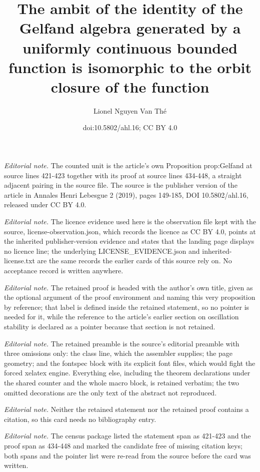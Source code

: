 \documentclass[10pt,a4paper]{article}
\title{The ambit of the identity of the Gelfand algebra generated by a uniformly continuous bounded function is isomorphic to the orbit closure of the function}
\author{Lionel Nguyen Van Thé}
\date{doi:10.5802/ahl.16; CC BY 4.0}
\theoremstyle{definition}
\numberwithin{equation}{section}
\numberwithin{figure}{section}
\numberwithin{table}{section}
\begin{document}
\maketitle
\noindent\textit{Editorial note.} The counted unit is the article's own Proposition prop:Gelfand at source lines 421-423 together with its proof at source lines 434-448, a straight adjacent pairing in the source file. The source is the publisher version of the article in Annales Henri Lebesgue 2 (2019), pages 149-185, DOI 10.5802/ahl.16, released under CC BY 4.0.\par\medskip
\noindent\textit{Editorial note.} The licence evidence used here is the observation file kept with the source, license-observation.json, which records the licence as CC BY 4.0, points at the inherited publisher-version evidence and states that the landing page displays no licence line; the underlying LICENSE\_EVIDENCE.json and inherited-license.txt are the same records the earlier cards of this source rely on. No acceptance record is written anywhere.\par\medskip
\noindent\textit{Editorial note.} The retained proof is headed with the author's own title, given as the optional argument of the proof environment and naming this very proposition by reference; that label is defined inside the retained statement, so no pointer is needed for it, while the reference to the article's earlier section on oscillation stability is declared as a pointer because that section is not retained.\par\medskip
\noindent\textit{Editorial note.} The retained preamble is the source's editorial preamble with three omissions only: the class line, which the assembler supplies; the page geometry; and the fontspec block with its explicit font files, which would fight the forced xelatex engine. Everything else, including the theorem declarations under the shared counter and the whole macro block, is retained verbatim; the two omitted decorations are the only text of the abstract not reproduced.\par\medskip
\noindent\textit{Editorial note.} Neither the retained statement nor the retained proof contains a citation, so this card needs no bibliography entry.\par\medskip
\noindent\textit{Editorial note.} The census package listed the statement span as 421-423 and the proof span as 434-448 and marked the candidate free of missing citation keys; both spans and the pointer list were re-read from the source before the card was written.\par\medskip
\end{document}
